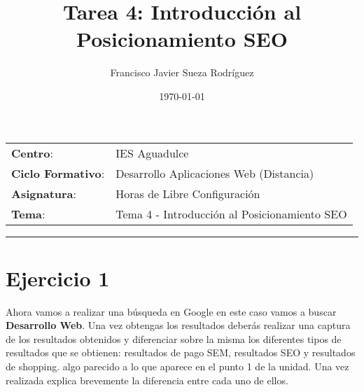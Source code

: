 


\title{
\vspace{10ex}
\normalfont \normalsize
\huge \textbf{Tarea 4: Introducción al Posicionamiento SEO}
}
\author{Francisco Javier Sueza Rodríguez}
\date{\normalsize\today}



\maketitle

\thispagestyle{empty}

\vspace{65ex}

\begin{center}
    \begin{tabular}{l l}
        \textbf{Centro}: & IES Aguadulce \\
        \textbf{Ciclo Formativo}: & Desarrollo Aplicaciones Web (Distancia)\\
        \textbf{Asignatura}: & Horas de Libre Configuración\\
        \textbf{Tema}: & Tema 4 - Introducción al Posicionamiento SEO\\
    \end{tabular}
\end{center}

\newpage

\tableofcontents

\vspace{15ex}
\hrule
\vspace{10ex}


\listoffigures

\newpage

\section{Ejercicio 1}
Ahora vamos a  realizar una búsqueda en Google en este caso vamos a buscar \textbf{Desarrollo Web}. Una vez obtengas los resultados deberás realizar una captura de los resultados obtenidos y diferenciar sobre la misma los diferentes tipos de resultados que se obtienen: resultados de pago SEM, resultados SEO y resultados de shopping. algo parecido a lo que aparece en el punto 1 de la unidad. Una vez realizada explica brevemente la diferencia entre cada uno de ellos.

